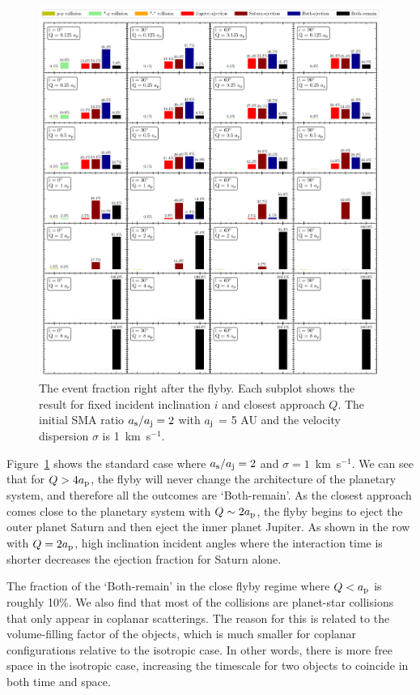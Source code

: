 \documentclass[twocolumn]{aastex63}
\newcommand*\fgr[1]{Figure~\ref{#1}}
\begin{document}
\begin{figure}
    \includegraphics[width=\textwidth]{figs/flyby-frac-s1-r2.pdf}
    \caption{The event fraction right after the flyby. Each subplot shows the result for fixed incident inclination $i$ and closest approach $Q$. The initial SMA ratio $a_{\rm s}/a_{\rm j}=2$ with $a_{\rm j}$ = 5 AU and the velocity dispersion $\sigma$ is 1~km~s$^{-1}$.}
    \label{fig:flyby-frac-s1-r2}
\end{figure}
\fgr{fig:flyby-frac-s1-r2} shows the standard case where $a_{\rm s}/a_{\rm j}=2$ and $\sigma=1$~km~s$^{-1}$. We can see that for $Q>4a_{\rm p}$, the flyby will never change the architecture of the planetary system, and therefore all the outcomes are `Both-remain'. As the closest approach comes close to the planetary system with $Q\sim 2a_{\rm p}$, the flyby begins to eject the outer planet Saturn and then eject the inner planet Jupiter. As shown in the row with $Q=2a_{\rm p}$, high inclination incident angles where the interaction time is shorter decreases the ejection fraction for Saturn alone. 

The fraction of the `Both-remain' in the close flyby regime where $Q<a_{\rm p}$ is roughly 10\%. We also find that most of the collisions are planet-star collisions that only appear in coplanar scatterings.  The reason for this is related to the volume-filling factor of the objects, which is much smaller for coplanar configurations relative to the isotropic case.  In other words, there is more free space in the isotropic case, increasing the timescale for two objects to coincide in both time and space.
\end{document}
